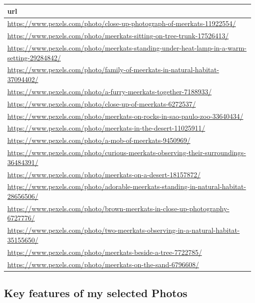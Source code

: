 \documentclass[
]{article}
\begin{document}
\begin{longtable}[]{@{}
  >{\raggedright\arraybackslash}p{}@{}}
\toprule\noalign{}
\begin{minipage}[b]{\linewidth}\raggedright
url
\end{minipage} \\
\midrule\noalign{}
\endhead
\bottomrule\noalign{}
\endlastfoot
\url{https://www.pexels.com/photo/close-up-photograph-of-meerkats-11922554/} \\
\url{https://www.pexels.com/photo/meerkats-sitting-on-tree-trunk-17526413/} \\
\url{https://www.pexels.com/photo/meerkats-standing-under-heat-lamp-in-a-warm-setting-29284842/} \\
\url{https://www.pexels.com/photo/family-of-meerkats-in-natural-habitat-37094402/} \\
\url{https://www.pexels.com/photo/a-furry-meerkats-together-7188933/} \\
\url{https://www.pexels.com/photo/close-up-of-meerkats-6272537/} \\
\url{https://www.pexels.com/photo/meerkats-on-rocks-in-sao-paulo-zoo-33640434/} \\
\url{https://www.pexels.com/photo/meerkats-in-the-desert-11025911/} \\
\url{https://www.pexels.com/photo/a-mob-of-meerkats-9450969/} \\
\url{https://www.pexels.com/photo/curious-meerkats-observing-their-surroundings-36484391/} \\
\url{https://www.pexels.com/photo/meerkats-on-a-desert-18157872/} \\
\url{https://www.pexels.com/photo/adorable-meerkats-standing-in-natural-habitat-28656506/} \\
\url{https://www.pexels.com/photo/brown-meerkats-in-close-up-photography-6727776/} \\
\url{https://www.pexels.com/photo/two-meerkats-observing-in-a-natural-habitat-35155650/} \\
\url{https://www.pexels.com/photo/meerkats-beside-a-tree-7722785/} \\
\url{https://www.pexels.com/photo/meerkats-on-the-sand-6796608/} \\
\end{longtable}

\subsection{Key features of my selected
Photos}\label{key-features-of-my-selected-photos}
\end{document}
